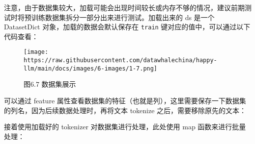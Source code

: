\documentclass[12pt,a4paper]{book}
\begin{document}
注意，由于数据集较大，加载可能会出现时间较长或内存不够的情况，建议前期测试时将预训练数据集拆分一部分出来进行测试。加载出来的
ds 是一个 DatasetDict 对象，加载的数据会默认保存在 \texttt{train}
键对应的值中，可以通过以下代码查看：

\begin{Shaded}
\begin{Highlighting}[]
\NormalTok{ds[}\NormalTok{][}\NormalTok{]}
\end{Highlighting}
\end{Shaded}

\begin{figure}[htbp]\centering
\texttt{[image: https://raw.githubusercontent.com/datawhalechina/happy-llm/main/docs/images/6-images/1-7.png]}
\caption{图6.7 数据集展示}
\end{figure}

可以通过 feature
属性查看数据集的特征（也就是列），这里需要保存一下数据集的列名，因为后续数据处理时，再将文本
tokenize 之后，需要移除原先的文本：

\begin{Shaded}
\begin{Highlighting}[]
\OperatorTok{=} \NormalTok{(ds[}\NormalTok{].features)}
\end{Highlighting}
\end{Shaded}

接着使用加载好的 tokenizer 对数据集进行处理，此处使用 map
函数来进行批量处理：

\begin{Shaded}
\begin{Highlighting}[]
\OperatorTok{=}\NormalTok{ tokenizer([item }\NormalTok{ examples[}\NormalTok{]])}

\OperatorTok{=}\NormalTok{(}
\OperatorTok{=}\NormalTok{,}
\OperatorTok{=}\NormalTok{,}
\OperatorTok{=}
\OperatorTok{=}\NormalTok{,}
\OperatorTok{=}\NormalTok{,}
\NormalTok{)}
\end{Highlighting}
\end{Shaded}
\end{document}

